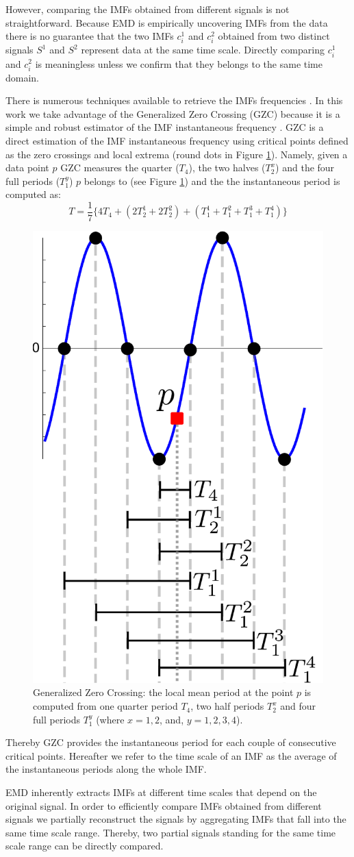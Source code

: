 However, comparing the IMFs obtained from different signals is not straightforward.
Because EMD is empirically uncovering IMFs from the data there is no guarantee that the two IMFs $c_i^1$ and $c_i^2$ obtained from two distinct signals $S^1$ and $S^2$ represent data at the same time scale.
Directly comparing $c_i^1$ and $c_i^2$ is meaningless unless we confirm that they belongs to the same time domain.

There is numerous techniques available to retrieve the IMFs frequencies \cite{huang:aada2009}.
In this work we take advantage of the Generalized Zero Crossing (GZC) \cite{huang:patent2006} because it is a simple and robust estimator of the IMF instantaneous frequency \cite{huang:aada2009}.
GZC is a direct estimation of the IMF instantaneous frequency using critical points defined as the zero crossings and local extrema (round dots in Figure \ref{fig:gzc}).
Namely, given a data point $p$ GZC measures the quarter ($T_4$), the two halves ($T_2^x$) and the four full periods ($T_1^y$) $p$  belongs to (see Figure \ref{fig:gzc}) and the the instantaneous period is computed as:
\[T=\frac{1}{7}\{4T_4+(2T_2^1+2T_2^2)+(T_1^1+T_1^2+T_1^3+T_1^4)\}\]

\begin{figure}
\begin{center}
 \includegraphics[width=.25\textwidth]{img/gzc.pdf}
 \end{center}
 \caption{Generalized Zero Crossing: the local mean period at the point $p$ is computed from one quarter period $T_4$, two half periods $T_2^x$ and four full periods $T_1^y$ (where $x=1, 2$, and, $y=1,2,3,4$).}
 \label{fig:gzc}
\end{figure}

Thereby GZC provides the instantaneous period for each couple of consecutive critical points.
Hereafter we refer to the time scale of an IMF as the average of the instantaneous periods along the whole IMF.

EMD inherently extracts IMFs at different time scales that depend on the original signal.
In order to efficiently compare IMFs obtained from different signals we partially reconstruct the signals by aggregating IMFs that fall into the same time scale range.
Thereby, two partial signals standing for the same time scale range can be directly compared.


